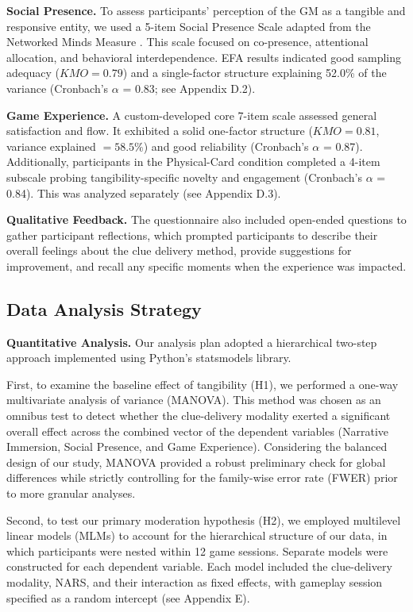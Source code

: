 \documentclass[sigconf,screen]{acmart-tagged}
\newcommand{\rev}[1]{#1}
\begin{document}
\noindent \rev{\textbf{Social Presence.} 
To assess participants' perception of the GM as a tangible and responsive entity, we used a 5-item Social Presence Scale adapted from the Networked Minds Measure \cite{harms2004internal}. This scale focused on co-presence, attentional allocation, and behavioral interdependence. EFA results indicated good sampling adequacy ($KMO = 0.79$) and a single-factor structure explaining 52.0\% of the variance (Cronbach's $\alpha$ = 0.83; see Appendix D.2).}

\noindent \rev{\textbf{Game Experience.} 
A custom-developed core 7-item scale assessed general satisfaction and flow. It exhibited a solid one-factor structure ($KMO = 0.81$, variance explained $= 58.5\%$) and good reliability (Cronbach's $\alpha$ = 0.87). Additionally, participants in the Physical-Card condition completed a 4-item subscale probing tangibility-specific novelty and engagement (Cronbach's $\alpha$ = 0.84). This was analyzed separately (see Appendix D.3).}

\noindent \textbf{Qualitative Feedback.}
The questionnaire also included open-ended questions to gather participant reflections, which prompted participants to describe their overall feelings about the clue delivery method, provide suggestions for improvement, and recall any specific moments when the experience was impacted.

\vspace{-12pt}
\subsection{Data Analysis Strategy}
\noindent \textbf{Quantitative Analysis.}
Our analysis plan adopted a hierarchical two-step approach implemented using Python's statsmodels library.

First, to examine the baseline effect of tangibility (H1), we performed a one-way multivariate analysis of variance (MANOVA). This method was chosen as an omnibus test to detect whether the clue-delivery modality exerted a significant overall effect across the combined vector of the dependent variables (Narrative Immersion, Social Presence, and Game Experience). Considering the balanced design of our study, MANOVA provided a robust preliminary check for global differences while strictly controlling for the family-wise error rate (FWER) prior to more granular analyses.

Second, to test our primary moderation hypothesis (H2), we employed multilevel linear models (MLMs) \cite{raudenbush2002hierarchical} to account for the hierarchical structure of our data, in which participants were nested within 12 game sessions. Separate models were constructed for each dependent variable. Each model included the clue-delivery modality, NARS, and their interaction as fixed effects, with gameplay session specified as a random intercept (see Appendix E).
\end{document}
